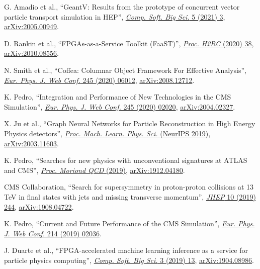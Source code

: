 \begin{description}[leftmargin=12pt,font=\normalfont,labelsep=0em]
\item \begin{sloppypar}G. Amadio et al., ``GeantV: Results from the prototype of concurrent vector particle transport simulation in HEP'', \href{https://doi.org/10.1007/s41781-020-00048-6}{\emph{Comp. Soft. Big Sci.} 5 (2021) 3}, \href{https://arxiv.org/abs/2005.00949}{arXiv:2005.00949}.\end{sloppypar}
\item D. Rankin et al., ``FPGAs-as-a-Service Toolkit (FaaST)'', \href{https://doi.ieeecomputersociety.org/10.1109/H2RC51942.2020.00010}{\emph{Proc. H2RC} (2020) 38}, \href{https://arxiv.org/abs/2010.08556}{arXiv:2010.08556}.
\item N. Smith et al., ``Coffea: Columnar Object Framework For Effective Analysis'', \href{https://doi.org/10.1051/epjconf/202024506012}{\emph{Eur. Phys. J. Web Conf.} 245 (2020) 06012}, \href{https://arxiv.org/abs/2008.12712}{arXiv:2008.12712}.
\item K. Pedro, ``Integration and Performance of New Technologies in the CMS Simulation'', \href{https://doi.org/10.1051/epjconf/202024502020}{\emph{Eur. Phys. J. Web Conf.} 245 (2020) 02020}, \href{https://arxiv.org/abs/2004.02327}{arXiv:2004.02327}.
\item X. Ju et al., ``Graph Neural Networks for Particle Reconstruction in High Energy Physics detectors'', \href{https://ml4physicalsciences.github.io/2019/#papers}{\emph{Proc. Mach. Learn. Phys. Sci.} (NeurIPS 2019)}, \href{https://arxiv.org/abs/2003.11603}{arXiv:2003.11603}.
\item K. Pedro, ``Searches for new physics with unconventional signatures at ATLAS and CMS'', \href{http://moriond.in2p3.fr/previous-sessions.html}{\emph{Proc. Moriond QCD} (2019)}, \href{https://arxiv.org/abs/1912.04180}{arXiv:1912.04180}.
\item CMS Collaboration, ``Search for supersymmetry in proton-proton collisions at 13 TeV in final states with jets and missing transverse momentum'', \href{http://dx.doi.org/10.1007/JHEP10(2019)244}{\emph{JHEP} 10 (2019) 244}, \href{https://arxiv.org/abs/1908.04722}{arXiv:1908.04722}.
\item K. Pedro, ``Current and Future Performance of the CMS Simulation'', \href{https://doi.org/10.1051/epjconf/201921402036}{\emph{Eur. Phys. J. Web Conf.} 214 (2019) 02036}.
\item \begin{sloppypar}J. Duarte et al., ``FPGA-accelerated machine learning inference as a service for particle physics computing'', \href{https://doi.org/10.1007/s41781-019-0027-2}{\emph{Comp. Soft. Big Sci.} 3 (2019) 13}, \href{https://arxiv.org/abs/1904.08986}{arXiv:1904.08986}.\end{sloppypar}

\end{description}
